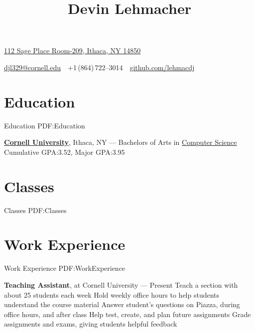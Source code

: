 \documentclass[letterpaper,10pt,oneside]{simpleresume}
\newcommand{\CVAuthor}{Devin Lehmacher}
\newcommand{\CVWebpage}{github.com/lehmacdj}
\begin{document}
\begin{minipage}[t][0pt]{\linewidth}
\pagestyle{empty}

\title{\CVAuthor}

\begin{subtitle}
\href{https://www.google.com/maps/place/112+Sage+Pl+Room-209,+Ithaca,+NY+14850}
{112 Sage Place Room-209, Ithaca, NY 14850}
\par
\href{mailto:djl329@cornell.edu}
{djl329@cornell.edu}
\,\SubBulletSymbol\,
+1\,(864)\,722--3014
\,\SubBulletSymbol\,
\href{https://\CVWebpage}
{\CVWebpage}
\end{subtitle}

\begin{body}

\section%
{Education}
{Education}
{PDF:Education}

\href{https://www.cornell.edu}
{\textbf{Cornell University}}, Ithaca, NY
\hfill
{} ---
\BulletItem%
Bachelors of Arts in
\href{https://www.cs.cornell.edu}{Computer Science}
\BulletItem%
Cumulative GPA:\@ 3.52, Major GPA:\@ 3.95

\section%
{Classes}
{Classes}
{PDF:Classes}


\section%
{Work Experience}
{Work Experience}
{PDF:WorkExperience}

\textbf{Teaching Assistant}, at Cornell University
\hfill
{} --- Present
\BulletItem%
Teach a section with about 25 students each week
\BulletItem%
Hold weekly office hours to help students understand the course material
\BulletItem%
Answer student's questions on Piazza, during office hours, and after class
\BulletItem%
Help test, create, and plan future assignments
\BulletItem%
Grade assignments and exams, giving students helpful feedback


\end{body}
\end{minipage}
\end{document}
